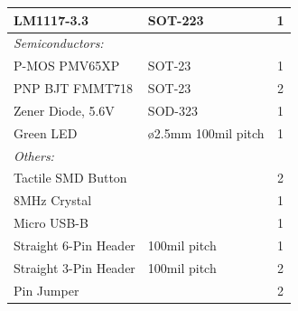 \begin{center}
\begin{tabular}{|l|l|c|}
	\hline
	LM1117-3.3 & SOT-223 & 1 \\
	\hline
	\emph{Semiconductors:} & & \\
	\hline
	P-MOS PMV65XP & SOT-23 & 1 \\
	\hline
	PNP BJT FMMT718 & SOT-23 & 2 \\
	\hline
	Zener Diode, 5.6V & SOD-323 & 1 \\
	\hline
	Green LED & ø2.5mm 100mil pitch& 1 \\
	\hline
	\emph{Others:} & & \\
	\hline
	Tactile SMD Button & & 2 \\
	\hline
	8MHz Crystal & & 1 \\
	\hline
	Micro USB-B & & 1 \\
	\hline
	Straight 6-Pin Header & 100mil pitch & 1 \\
	\hline
	Straight 3-Pin Header & 100mil pitch & 2 \\
	\hline
	Pin Jumper & & 2 \\
	\hline
\end{tabular}
\end{center}

\clearpage
